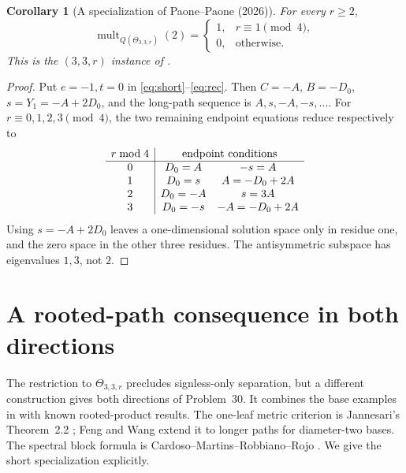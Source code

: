 \documentclass[11pt]{article}
\newtheorem{corollary}[theorem]{Corollary}
\newcommand{\Th}{\Theta}
\begin{document}
\begin{corollary}[A specialization of Paone--Paone (2026)]\label{cor:two}
For every $r\geq2$,
\[
 \operatorname{mult}_{Q(\Th_{3,3,r})}(2)
 =\begin{cases}1,&r\equiv1\pmod4,\\0,&\text{otherwise}.\end{cases}
\]
This is the $(3,3,r)$ instance of \cite[Corollary~8.1]{PP}.
\end{corollary}
\begin{proof}
Put $e=-1,t=0$ in \eqref{eq:short}--\eqref{eq:rec}.
Then $C=-A$, $B=-D_0$, $s=Y_1=-A+2D_0$, and the long-path
sequence is $A,s,-A,-s,\ldots$.
For $r\equiv0,1,2,3\pmod4$, the two remaining endpoint equations
reduce respectively to
\[
\begin{array}{c|cc}
r\bmod4&\multicolumn{2}{c}{\text{endpoint conditions}}\\\hline
0&D_0=A&-s=A\\
1&D_0=s&A=-D_0+2A\\
2&D_0=-A&s=3A\\
3&D_0=-s&-A=-D_0+2A
\end{array}
\]
Using $s=-A+2D_0$ leaves a one-dimensional solution space only
in residue one, and the zero space in the other three residues.
The antisymmetric subspace has eigenvalues $1,3$, not $2$.
\end{proof}

\section{A rooted-path consequence in both directions}
The restriction to $\Th_{3,3,r}$ precludes signless-only separation,
but a different construction gives both directions of Problem~30.
It combines the base examples in \cite[Theorems~10, 12 and Corollary~17]{AKS}
with known rooted-product results. The one-leaf metric criterion is
Jannesari's Theorem~2.2 \cite{J}; Feng and Wang
\cite[Proposition~2.10, equation (5)]{FW} extend it to longer paths
for diameter-two bases. The spectral block formula is
Cardoso--Martins--Robbiano--Rojo \cite[Theorem~2.1, equation (2.4)]{CMRR}.
We give the short specialization explicitly.
\end{document}
